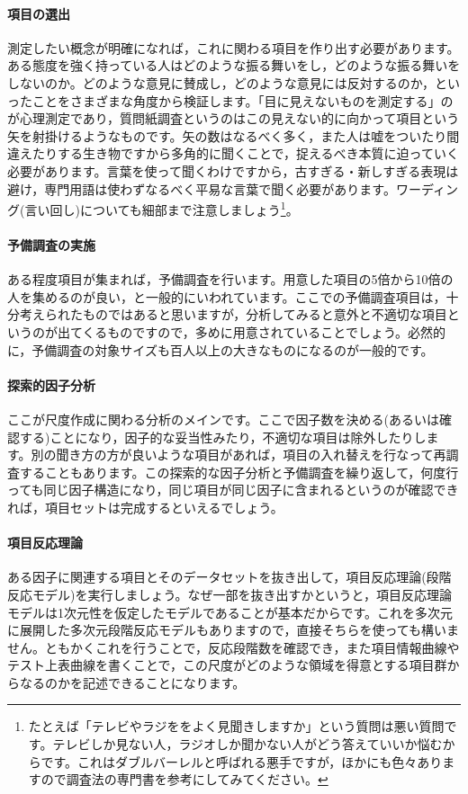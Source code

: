 \documentclass{ltjsbook}
\begin{document}
\paragraph{項目の選出}測定したい概念が明確になれば，これに関わる項目を作り出す必要があります。ある態度を強く持っている人はどのような振る舞いをし，どのような振る舞いをしないのか。どのような意見に賛成し，どのような意見には反対するのか，といったことをさまざまな角度から検証します。「目に見えないものを測定する」のが心理測定であり，質問紙調査というのはこの見えない的に向かって項目という矢を射掛けるようなものです。矢の数はなるべく多く，また人は嘘をついたり間違えたりする生き物ですから多角的に聞くことで，捉えるべき本質に迫っていく必要があります。言葉を使って聞くわけですから，古すぎる・新しすぎる表現は避け，専門用語は使わずなるべく平易な言葉で聞く必要があります。ワーディング(言い回し)についても細部まで注意しましょう\footnote{たとえば「テレビやラジををよく見聞きしますか」という質問は悪い質問です。テレビしか見ない人，ラジオしか聞かない人がどう答えていいか悩むからです。これはダブルバーレルと呼ばれる悪手ですが，ほかにも色々ありますので調査法の専門書を参考にしてみてください。}。

\paragraph{予備調査の実施}ある程度項目が集まれば，予備調査を行います。用意した項目の5倍から10倍の人を集めるのが良い，と一般的にいわれています\citep{kosugi2016a}。ここでの予備調査項目は，十分考えられたものではあると思いますが，分析してみると意外と不適切な項目というのが出てくるものですので，多めに用意されていることでしょう。必然的に，予備調査の対象サイズも百人以上の大きなものになるのが一般的です。

\paragraph{探索的因子分析}ここが尺度作成に関わる分析のメインです。ここで因子数を決める(あるいは確認する)ことになり，因子的な妥当性みたり，不適切な項目は除外したりします。別の聞き方の方が良いような項目があれば，項目の入れ替えを行なって再調査することもあります。この探索的な因子分析と予備調査を繰り返して，何度行っても同じ因子構造になり，同じ項目が同じ因子に含まれるというのが確認できれば，項目セットは完成するといえるでしょう。

\paragraph{項目反応理論}ある因子に関連する項目とそのデータセットを抜き出して，項目反応理論(段階反応モデル)を実行しましょう。なぜ一部を抜き出すかというと，項目反応理論モデルは1次元性を仮定したモデルであることが基本だからです。これを多次元に展開した多次元段階反応モデルもありますので，直接そちらを使っても構いません。ともかくこれを行うことで，反応段階数を確認でき，また項目情報曲線やテスト上表曲線を書くことで，この尺度がどのような領域を得意とする項目群からなるのかを記述できることになります。
\end{document}
